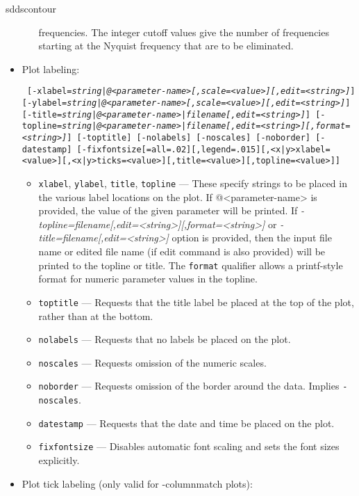 \begin{sddsprog}{sddscontour}
\begin{itemize}
\begin{itemize}
        frequencies.  The integer cutoff values give the number of frequencies starting at the Nyquist frequency
        that are to be eliminated.
        \end{itemize}
    \item Plot labeling:
\begin{flushleft}{\tt
[-xlabel={\em string|@<parameter-name>[,scale=<value>][,edit=<string>]}]
[-ylabel={\em string|@<parameter-name>[,scale=<value>][,edit=<string>]}]
[-title={\em string|@<parameter-name>|filename[,edit=<string>]}]
[-topline={\em string|@<parameter-name>|filename[,edit=<string>][,format=<string>]}]
[-toptitle] [-nolabels] [-noscales] [-noborder] [-datestamp]
[-fixfontsize[=all=.02][,legend=.015][,<x|y>xlabel=<value>][,<x|y>ticks=<value>][,title=<value>][,topline=<value>]]
}\end{flushleft}
        \begin{itemize}
        \item \verb|xlabel|, \verb|ylabel|, \verb|title|, \verb|topline| --- These specify strings to be placed
                in the various label locations on the plot. If @<parameter-name> is provided, the value of the
                given parameter will be printed.  If {\em -topline=filename[,edit=<string>][,format=<string>]} or
                {\em -title=filename[,edit=<string>]} option is provided, then the input file name or edited file
                name (if edit command is also provided) will be printed to the topline or title.  The
                \verb|format| qualifier allows a printf-style format for numeric parameter values in the topline.
        \item \verb|toptitle| --- Requests that the title label be placed at the top of the plot, rather than
                at the bottom.
        \item \verb|nolabels| --- Requests that no labels be placed on the plot.
        \item \verb|noscales| --- Requests omission of the numeric scales.
        \item \verb|noborder| --- Requests omission of the border around the data.  Implies \verb|-noscales|.
        \item \verb|datestamp| --- Requests that the date and time be placed on the plot.
        \item \verb|fixfontsize| --- Disables automatic font scaling and sets the font sizes explicitly.
        \end{itemize}
    \item Plot tick labeling (only valid for -columnmatch plots):

\end{itemize}
\end{sddsprog}
